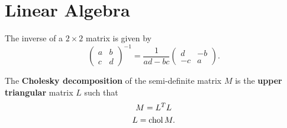 \section{Linear Algebra}
\begin{outline}
  \1 The inverse of a $2\times2$ matrix is given by
  \begin{equation*}
    \begin{pmatrix}a&b\\c&d\end{pmatrix}^{-1} = \frac{1}{ad-bc}\begin{pmatrix}d&-b\\-c&a\end{pmatrix}.
  \end{equation*}

  \1 The \textbf{Cholesky decomposition} of the semi-definite matrix $M$ is the
  \textbf{upper triangular} matrix $L$ such that
  \begin{gather*}
    M = L^TL\\
    L = \operatorname{chol} M.
  \end{gather*}
\end{outline}


